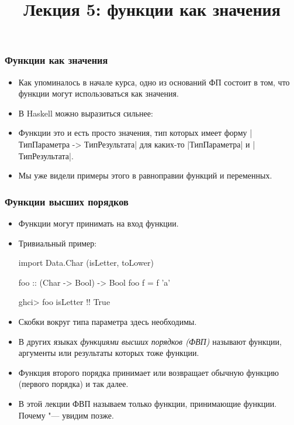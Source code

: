 \documentclass[10pt]{beamer}
\title{Лекция 5: функции как значения}
\begin{document}
\begin{frame}[plain]
  \maketitle
\end{frame}

\begin{frame}[fragile]
  \frametitle{Функции как значения}
  \begin{itemize}
    \item Как упоминалось в начале курса, одно из оснований ФП состоит в том, что функции могут использоваться как значения.
    \item В Haskell можно выразиться сильнее:\pause
    \item Функции это и есть просто значения, тип которых имеет форму \haskinline|ТипПараметра -> ТипРезультата| для каких-то \haskinline|ТипПараметра| и \haskinline|ТипРезультата|.\pause
    \item Мы уже видели примеры этого в равноправии функций и переменных.
  \end{itemize}
\end{frame}

\begin{frame}[fragile]
  \frametitle{Функции высших порядков}
  \begin{itemize}
    \item Функции могут принимать на вход функции.
    \item Тривиальный пример:
          \begin{haskell}
            import Data.Char (isLetter, toLower)

            foo :: (Char -> Bool) -> Bool
            foo f = f 'a'

            ghci> foo isLetter !\pause!
            True
          \end{haskell}
    \item Скобки вокруг типа параметра здесь необходимы.\pause
    \item В других языках \emph{функциями высших порядков (ФВП)} называют функции, аргументы или результаты которых тоже функции.\pause
    \item Функция второго порядка принимает или возвращает обычную функцию (первого порядка) и так далее.\pause
    \item В этой лекции ФВП называем только функции, принимающие функции. Почему "--- увидим позже.
  \end{itemize}
\end{frame}
\end{document}
